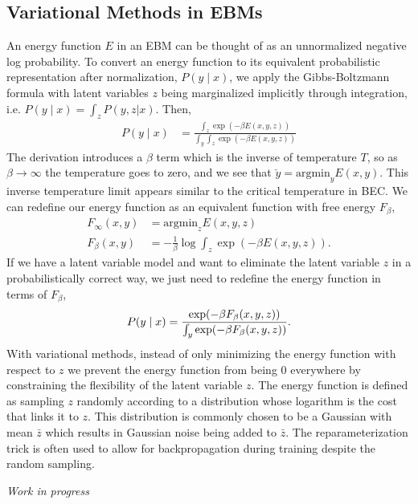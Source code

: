 \documentclass{article}
\begin{document}
    \subsection{Variational Methods in EBMs}
    An energy function $E$ in an EBM can be thought of as an unnormalized negative log probability. 
    To convert an energy function to its equivalent probabilistic representation after normalization,
    $P(y \mid x)$, we apply the Gibbs-Boltzmann formula with latent variables $z$ being marginalized implicitly through integration, i.e. $P(y \mid x) = \int_z P(y,z | x)$. Then,
    \begin{align*}
        P(y \mid x) &= \frac{ \int_z \exp(-\beta E(x,y,z)) }{ \int_y \int_z \exp(-\beta E(x, y, z))} 
    \end{align*}
    The derivation introduces a $\beta$ term which is the inverse of temperature $T$, so as $\beta \rightarrow \infty$ the temperature goes to zero, and we see that $\check{y} = \text{argmin}_{y} E(x,y)$. This inverse temperature limit appears similar to the critical temperature in BEC. We can redefine our energy function as an equivalent function with free energy $F_\beta$,
    \begin{align*}
        F_{\infty} (x,y) &= \text{argmin}_z E(x,y,z)\\
        F_{\beta} (x,y) &= -\frac{1}{\beta} \log \int_z \exp(-\beta E(x,y,z)).
    \end{align*}
    If we have a latent variable model and want to eliminate the latent variable $z$ in a probabilistically correct way, we just need to redefine the energy function in terms of $F_\beta$,
    \[
        P(y \mid x) = \frac{ \exp(-\beta F_\beta(x,y,z)) }{ \int_y \exp(-\beta F_\beta(x, y, z))}. \\
    \]
    With variational methods, instead of only minimizing the energy function with respect to $z$ we prevent the energy function from being 0 everywhere by constraining the flexibility of the latent variable $z$. The energy function is defined as sampling $z$ randomly according to a distribution whose logarithm is the cost that links it to $z$. This distribution is commonly chosen to be a Gaussian with mean $\bar z$ which results in Gaussian noise being added to $\bar z$. The reparameterization trick is often used to allow for backpropagation during training despite the random sampling.

\textit{Work in progress}
\end{document}
